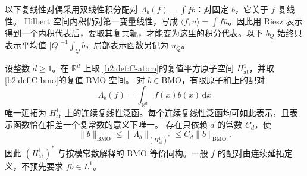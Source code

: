 \ProseParagraphBreak

以下复线性对偶采用双线性积分配对
\(\Lambda_b(f)=\int fb\)：对固定 \(b\)，它关于 \(f\) 复线性。
Hilbert 空间内积仍对第一变量线性，写成
\(\langle f,u\rangle=\int f\overline u\)。因此用 Riesz 表示得到一个内积代表后，要取其复共轭，才能变为这里的积分代表。以下
\(b_Q\) 始终只表示平均值 \(|Q|^{-1}\int_Qb\)，局部表示函数另记为
\(u_Q\)。

\begin{theorem}
\label{b2:thm:C-atomic-duality}
设整数 \(d\ge1\)。在 \(\mathbb R^d\) 上取
\cref{b2:def:C-atom}的复值平方原子空间
\(H^1_{\mathrm{at}}\)，并取\cref{b2:def:C-bmo}的复值 BMO 空间。
对 \(b\in\mathrm{BMO}\)，有限原子和上的配对
\[
 \Lambda_b(f)=\int_{\mathbb R^d}f(x)b(x)\,\mathrm dx
\]
唯一延拓为 \(H^1_{\mathrm{at}}\) 上的连续复线性泛函。每个连续复线性泛函均可如此表示，且表示函数恰在相差一个复常数的意义下唯一。
存在只依赖 \(d\) 的常数 \(C_d\)，使
\[
 \|b\|_{\mathrm{BMO}}
 \le\|\Lambda_b\|_{(H^1_{\mathrm{at}})^*}
 \le C_d\|b\|_{\mathrm{BMO}}.
\]
因此 \((H^1_{\mathrm{at}})^*\) 与按模常数解释的
\(\mathrm{BMO}\) 等价同构。一般 \(f\) 的配对由连续延拓定义，不预先要求
\(fb\in L^1\)。
\end{theorem}
